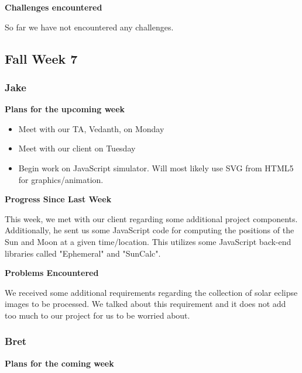 \documentclass[10pt, onecolumn, draftclsnofoot, letterpaper, compsoc]{IEEEtran}
\begin{document}
    \noindent \textbf{Challenges encountered}

    So far we have not encountered any challenges.

\subsection{Fall Week 7}

    \subsubsection{Jake}

    \noindent \textbf{Plans for the upcoming week}

    \begin{itemize}

    \item Meet with our TA, Vedanth, on Monday
    \item Meet with our client on Tuesday
    \item Begin work on JavaScript simulator. Will most likely use SVG from HTML5 for
    graphics/animation.

    \end{itemize}

    \noindent \textbf{Progress Since Last Week}

    This week, we met with our client regarding some additional project components.
    Additionally, he sent us some JavaScript code for computing the positions of the
    Sun and Moon at a given time/location. This utilizes some JavaScript back-end
    libraries called "Ephemeral" and "SunCalc".

    \noindent \textbf{Problems Encountered}

    We received some additional requirements regarding the collection of solar eclipse
    images to be processed. We talked about this requirement and it does not add too
    much to our project for us to be worried about.

    \subsubsection{Bret}

    \noindent \textbf{Plans for the coming week}
\end{document}
